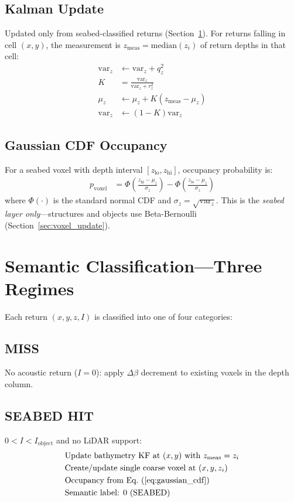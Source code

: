 \documentclass[10pt,twocolumn]{article}
\begin{document}
\subsection{Kalman Update}

Updated only from seabed-classified returns (Section~\ref{sec:semantic}). For returns falling in cell $(x,y)$, the measurement is $z_{\text{meas}} = \text{median}(z_i)$ of return depths in that cell:
\begin{align}
\text{var}_z &\leftarrow \text{var}_z + q_z^2 \label{eq:pred_var_z} \\
K &= \frac{\text{var}_z}{\text{var}_z + r_z^2} \\
\mu_z &\leftarrow \mu_z + K(z_{\text{meas}} - \mu_z) \\
\text{var}_z &\leftarrow (1 - K)\text{var}_z \label{eq:upd_var_z}
\end{align}

\subsection{Gaussian CDF Occupancy}

For a seabed voxel with depth interval $[z_{\text{lo}}, z_{\text{hi}}]$, occupancy probability is:
\begin{align}
p_{\text{voxel}} &= \Phi\left(\frac{z_{\text{hi}} - \mu_z}{\sigma_z}\right) - \Phi\left(\frac{z_{\text{lo}} - \mu_z}{\sigma_z}\right) \label{eq:gaussian_cdf}
\end{align}
where $\Phi(\cdot)$ is the standard normal CDF and $\sigma_z = \sqrt{\text{var}_z}$. This is the \emph{seabed layer only}---structures and objects use Beta-Bernoulli (Section~\ref{sec:voxel_update}).

\section{Semantic Classification---Three Regimes} \label{sec:semantic}

Each return $(x, y, z, I)$ is classified into one of four categories:

\subsection{MISS}
No acoustic return ($I = 0$): apply $\Delta\beta$ decrement to existing voxels in the depth column.

\subsection{SEABED HIT}
$0 < I < I_{\text{object}}$ and no LiDAR support:
\begin{align}
&\text{Update bathymetry KF at } (x,y) \text{ with } z_{\text{meas}} = z_i \\
&\text{Create/update single coarse voxel at } (x,y,z_i) \\
&\text{Occupancy from Eq.~(\ref{eq:gaussian_cdf})} \label{eq:seabed_class} \\
&\text{Semantic label: } 0 \text{ (SEABED)}
\end{align}
\end{document}
